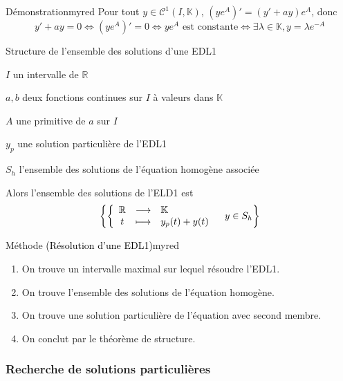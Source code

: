     \begin{demo}{Démonstration}{myred}
        Pour tout $y \in \mathcal{C}^1(I,\mathbb{K})$, $\left(ye^A\right)' = \left(y' + ay\right)e^A$, donc 
        \[ y' +ay = 0 \iff \left(ye^A\right)' = 0 \iff ye^A \text{ est constante} \iff \exists \lambda \in \mathbb{K}, y = \lambda e^{-A} \] 
    \end{demo}

    \begin{theo}{Structure de l’ensemble des solutions d’une EDL1}{}
        \begin{soient}
            \item $I$ un intervalle de $\mathbb{R}$
            \item $a,b$ deux fonctions continues sur $I$ à valeurs dans $\mathbb{K}$
            \item $A$ une primitive de $a$ sur $I$
            \item $y_{p}$ une solution particulière de l’EDL1
            \item $S_h$ l’ensemble des solutions de l’équation homogène associée
        \end{soient}
    Alors l’ensemble des solutions de l’ELD1 est 
    \[ \left\{ \application{\mathbb{R}}{\mathbb{K}}{t}{y_p(t) + y(t)} \quad y \in S_h \right\} \]
    \end{theo}

    \begin{omed}{Méthode \textcolor{black}{(Résolution d’une EDL1)}}{myred}
        \begin{enumerate}
            \item On trouve un intervalle maximal sur lequel résoudre l’EDL1.
            \item On trouve l’ensemble des solutions de l’équation homogène.
            \item On trouve une solution particulière de l’équation avec second membre.
            \item On conclut par le théorème de structure.
        \end{enumerate}
    \end{omed}

    \subsubsection{Recherche de solutions particulières}

